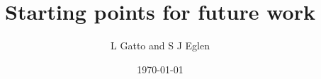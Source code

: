 \documentclass{beamer}
\title{Starting points for future work}
\author{L Gatto and S J Eglen}
\date{\today}
\begin{document}
\maketitle





\makeatletter
\def\DIfF^#1{%
  \mathop{\mathrm{\mathstrut \text{d}}}%
  \nolimits^{#1}\gobblespace}
\makeatother

\newdimen{\fragwidth}

\newcommand{\mybottomleft}[1]{
\settowidth{\fragwidth}{#1}
\begin{textblock*}{\fragwidth}[0,0](2mm,90mm)  %
  #1
\end{textblock*}
}

\newcommand{\mybottomright}[1]{
\settowidth{\fragwidth}{#1}
\begin{textblock*}{\fragwidth}[1,0](126mm,90mm)  %
  #1
\end{textblock*}
}

\newcommand{\deriv}[3][]{%
  \ensuremath{\frac{\partial^{#1} {#2}}{\partial {#3}^{#1}}}}
\end{document}
